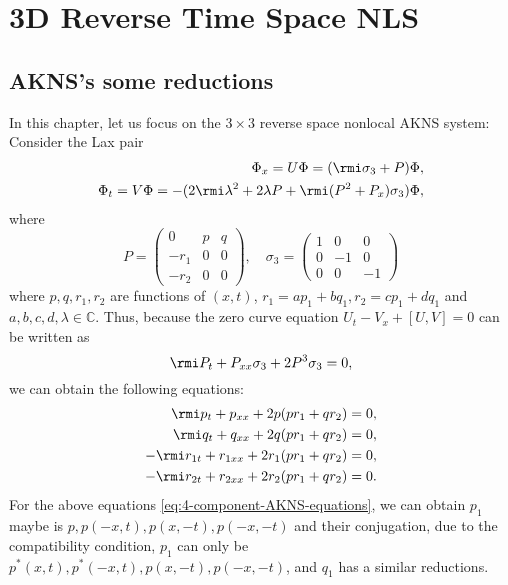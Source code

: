 \chapter{3D Reverse Time Space NLS}
\section{AKNS's some reductions}
In this chapter, let us focus on the $ 3 \times 3 $ reverse space nonlocal AKNS system: Consider the Lax pair
\begin{equation}
    \begin{aligned}
        \Phi_{x} = U \Phi = (\rmi \sigma_{3} + P)\Phi, \\
        \Phi_{t} = V \Phi = - (2 \rmi \lambda^{2} + 2\lambda P + \rmi(P^{2} + P_{x})\sigma_{3})\Phi, 
    \end{aligned}
\end{equation}
where 
\begin{equation}
    P = \begin{pmatrix}
        0 & p & q \\
        -r_{1} & 0 & 0 \\
        -r_{2} & 0 & 0
    \end{pmatrix}, \quad \sigma_{3} = \begin{pmatrix}
        1 & 0 & 0 \\
        0 & -1 & 0 \\
        0 & 0 & -1
    \end{pmatrix}
\end{equation}
where $ p, q, r_{1}, r_{2} $ are functions of $ (x,t) $, $ r_{1} = ap_{1} + bq_{1}, r_{2} = cp_{1} + dq_{1}$ and $ a, b, c, d, \lambda \in \mathbb{C} $. Thus, because the zero curve equation $ U_{t} - V_{x} +[U,V] = 0 $ can be written as
\begin{equation}
    \rmi P_{t} + P_{xx}\sigma_{3} + 2P^{3}\sigma_{3} = 0, \label{eq:3d-NLS-zero-curve-equation}
\end{equation}
we can obtain the following equations:
\begin{subequations}
    \begin{align}
        \rmi p_{t} + p_{xx} + 2p(pr_{1} + qr_{2}) &= 0, \\
        \rmi q_{t} + q_{xx} + 2q(pr_{1} + qr_{2}) &= 0, \\
        -\rmi r_{1t} + r_{1xx} + 2r_{1}(pr_{1} + qr_{2}) &= 0, \\
        -\rmi r_{2t} + r_{2xx} + 2r_{2}(pr_{1} + qr_{2}) &= 0.
    \end{align} \label{eq:4-component-AKNS-equations}
\end{subequations}
For the above equations \eqref{eq:4-component-AKNS-equations}, we can obtain $ p_{1} $ maybe is $ p, p(-x,t), p(x,-t), p(-x,-t) $ and their conjugation, due to the compatibility condition, $p_1$ can only be $ p^{*}(x,t), p^{*}(-x,t), p(x,-t), p(-x,-t) $, and $ q_1 $ has a similar reductions.

